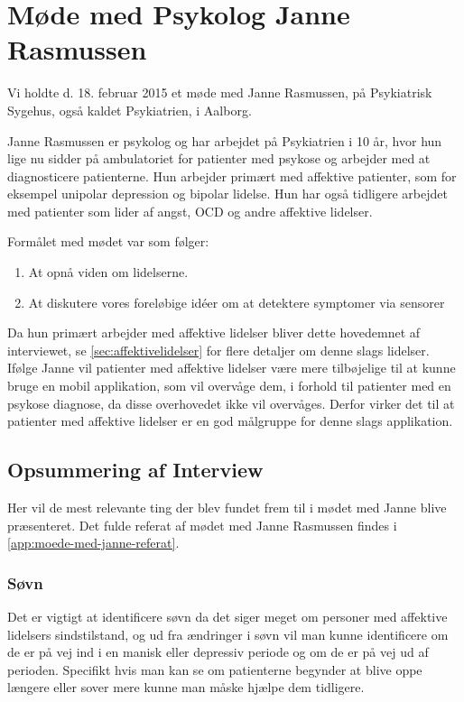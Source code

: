 \section{Møde med Psykolog Janne Rasmussen}\label{sec:moede-med-psykolog}
Vi holdte d. 18. februar 2015 et møde med Janne Rasmussen, på Psykiatrisk Sygehus, også kaldet Psykiatrien, i Aalborg.

Janne Rasmussen er psykolog og har arbejdet på Psykiatrien i 10 år, hvor hun lige nu sidder på ambulatoriet for patienter med psykose og arbejder med at diagnosticere patienterne. 
Hun arbejder primært med affektive patienter, som for eksempel unipolar depression og bipolar lidelse.
Hun har også tidligere arbejdet med patienter som lider af angst, OCD og andre affektive lidelser.

Formålet med mødet var som følger:

\begin{enumerate}
\item At opnå viden om lidelserne.
\item At diskutere vores foreløbige idéer om at detektere symptomer via sensorer
\end{enumerate}

Da hun primært arbejder med affektive lidelser bliver dette hovedemnet af interviewet, se \cref{sec:affektivelidelser} for flere detaljer om denne slags lidelser.
Ifølge Janne vil patienter med affektive lidelser være mere tilbøjelige til at kunne bruge en mobil applikation, som vil overvåge dem, i forhold til patienter med en psykose diagnose, da disse overhovedet ikke vil overvåges.
Derfor virker det til at patienter med affektive lidelser er en god målgruppe for denne slags applikation.

\subsection{Opsummering af Interview}
Her vil de mest relevante ting der blev fundet frem til i mødet med Janne blive præsenteret.
Det fulde referat af mødet med Janne Rasmussen findes i \cref{app:moede-med-janne-referat}.

\subsubsection{Søvn}
Det er vigtigt at identificere søvn da det siger meget om personer med affektive lidelsers sindstilstand, og ud fra ændringer i søvn vil man kunne identificere om de er på vej ind i en manisk eller depressiv periode og om de er på vej ud af perioden. 
Specifikt hvis man kan se om patienterne begynder at blive oppe længere eller sover mere kunne man måske hjælpe dem tidligere.

